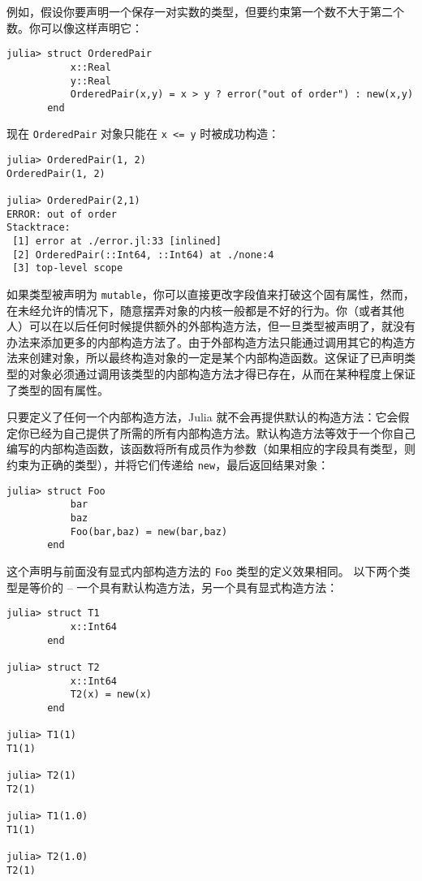 例如，假设你要声明一个保存一对实数的类型，但要约束第一个数不大于第二个数。你可以像这样声明它：




\begin{verbatim}
julia> struct OrderedPair
           x::Real
           y::Real
           OrderedPair(x,y) = x > y ? error("out of order") : new(x,y)
       end
\end{verbatim}



现在 \texttt{OrderedPair} 对象只能在 \texttt{x <= y} 时被成功构造：




\begin{verbatim}
julia> OrderedPair(1, 2)
OrderedPair(1, 2)

julia> OrderedPair(2,1)
ERROR: out of order
Stacktrace:
 [1] error at ./error.jl:33 [inlined]
 [2] OrderedPair(::Int64, ::Int64) at ./none:4
 [3] top-level scope
\end{verbatim}



如果类型被声明为 \texttt{mutable}，你可以直接更改字段值来打破这个固有属性，然而，在未经允许的情况下，随意摆弄对象的内核一般都是不好的行为。你（或者其他人）可以在以后任何时候提供额外的外部构造方法，但一旦类型被声明了，就没有办法来添加更多的内部构造方法了。由于外部构造方法只能通过调用其它的构造方法来创建对象，所以最终构造对象的一定是某个内部构造函数。这保证了已声明类型的对象必须通过调用该类型的内部构造方法才得已存在，从而在某种程度上保证了类型的固有属性。



只要定义了任何一个内部构造方法，Julia 就不会再提供默认的构造方法：它会假定你已经为自己提供了所需的所有内部构造方法。默认构造方法等效于一个你自己编写的内部构造函数，该函数将所有成员作为参数（如果相应的字段具有类型，则约束为正确的类型），并将它们传递给 \texttt{new}，最后返回结果对象：




\begin{verbatim}
julia> struct Foo
           bar
           baz
           Foo(bar,baz) = new(bar,baz)
       end

\end{verbatim}



这个声明与前面没有显式内部构造方法的 \texttt{Foo} 类型的定义效果相同。 以下两个类型是等价的 – 一个具有默认构造方法，另一个具有显式构造方法：




\begin{verbatim}
julia> struct T1
           x::Int64
       end

julia> struct T2
           x::Int64
           T2(x) = new(x)
       end

julia> T1(1)
T1(1)

julia> T2(1)
T2(1)

julia> T1(1.0)
T1(1)

julia> T2(1.0)
T2(1)
\end{verbatim}



